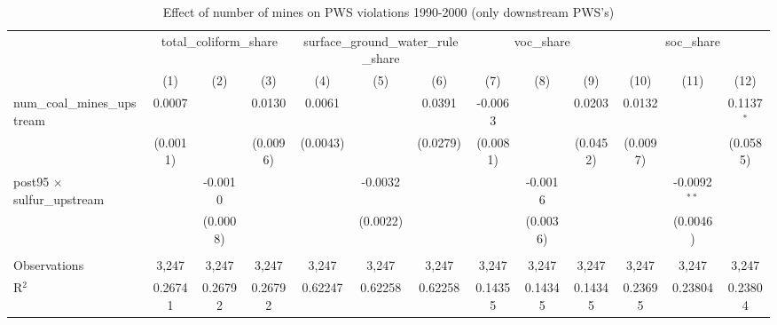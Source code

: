 
\begin{table}[htbp]
   \caption{\label{olsrf2sls_nummine_non_mine_vio_1990to2000dwnstrm} Effect of number of mines on PWS violations 1990-2000 (only downstream PWS's)}
   \bigskip
   \centering
   \begin{adjustbox}{width = \textwidth, center}
      \begin{tabular}{lcccccccccccc}
         \toprule
          & \multicolumn{3}{c}{total\_coliform\_share} & \multicolumn{3}{c}{surface\_ground\_water\_rule\_share} & \multicolumn{3}{c}{voc\_share} & \multicolumn{3}{c}{soc\_share}\\
                                                           & (1)                   & (2)           & (3)           & (4)           & (5)           & (6)           & (7)           & (8)                   & (9)                   & (10)          & (11)           & (12)\\  
         \midrule 
         num\_coal\_mines\_upstream                        & 0.0007                &               & 0.0130        & 0.0061        &               & 0.0391        & -0.0063       &                       & 0.0203                & 0.0132        &                & 0.1137$^{*}$\\   
                                                           & (0.0011)              &               & (0.0096)      & (0.0043)      &               & (0.0279)      & (0.0081)      &                       & (0.0452)              & (0.0097)      &                & (0.0585)\\   
         post95 $\times$ sulfur\_upstream                  &                       & -0.0010       &               &               & -0.0032       &               &               & -0.0016               &                       &               & -0.0092$^{**}$ &   \\   
                                                           &                       & (0.0008)      &               &               & (0.0022)      &               &               & (0.0036)              &                       &               & (0.0046)       &   \\   
          \\
         Observations                                      & 3,247                 & 3,247         & 3,247         & 3,247         & 3,247         & 3,247         & 3,247         & 3,247                 & 3,247                 & 3,247         & 3,247          & 3,247\\  
         R$^2$                                             & 0.26741               & 0.26792       & 0.26792       & 0.62247       & 0.62258       & 0.62258       & 0.14355       & 0.14345               & 0.14345               & 0.23695       & 0.23804        & 0.23804\\  

\end{tabular}
\end{adjustbox}
\end{table}
